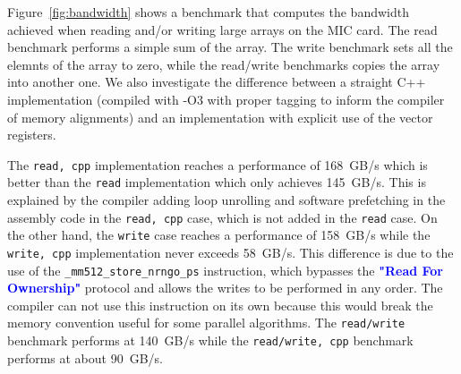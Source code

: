 \documentclass{sig-alternate}
\def\blue#1{\textbf{\textcolor{blue}{#1}}}
\def\ge#1{{\blue{#1}}}
\begin{document}
Figure~\ref{fig:bandwidth} shows a benchmark that computes the
bandwidth achieved when reading and/or writing large arrays on 
the MIC card. The read benchmark performs a
simple sum of the array. The write benchmark sets all the elemnts of
the array to zero, while the read/write benchmarks copies the array into
another one. We also investigate the difference between a straight C++
implementation (compiled with \mbox{-O3} with proper tagging to inform the
compiler of memory alignments) and an implementation with
explicit use of the vector registers.

The {\tt read, cpp} implementation reaches a performance of 168~GB/s
 which is better than the {\tt read}
implementation which only achieves 145~GB/s. This
is explained by the compiler adding loop unrolling and software
prefetching in the assembly code in the {\tt read, cpp} case, which is
not added in the {\tt read} case. On the other hand, the {\tt write}
case reaches a performance of 158~GB/s while the
{\tt write, cpp} implementation never exceeds 58~GB/s. 
This difference is due to the use of the {\tt \_mm512\_store\_nrngo\_ps} instruction, 
which bypasses the \ge{"Read For Ownership"} protocol and allows the writes
to be performed in any order. The compiler can not use this
instruction on its own because this would break the memory convention
useful for some parallel algorithms. The {\tt read/write} benchmark
performs at 140~GB/s while the {\tt read/write, cpp} benchmark performs
at about 90~GB/s.
\end{document}
